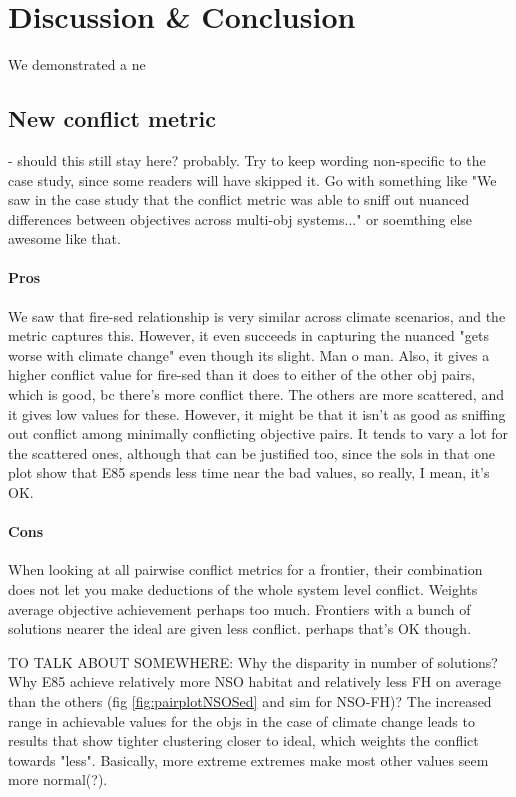 \section{Discussion \& Conclusion}
We demonstrated a ne

\subsection{New conflict metric} - should this still stay here? probably. Try to keep wording non-specific to the case study, since some readers will have skipped it. Go with something like "We saw in the case study that the conflict metric was able to sniff out nuanced differences between objectives across multi-obj systems..." or soemthing else awesome like that.

\paragraph{Pros}
We saw that fire-sed relationship is very similar across climate scenarios, and the metric captures this. However, it even succeeds in capturing the nuanced "gets worse with climate change" even though its slight. Man o man.
Also, it gives a higher conflict value for fire-sed than it does to either of the other obj pairs, which is good, bc there's more conflict there. The others are more scattered, and it gives low values for these.
However, it might be that it isn't as good as sniffing out conflict among minimally conflicting objective pairs. It tends to vary a lot for the scattered ones, although that can be justified too, since the sols in that one plot show that E85 spends less time near the bad values, so really, I mean, it's OK.

\paragraph{Cons}
When looking at all pairwise conflict metrics for a frontier, their combination does not let you make deductions of the whole system level conflict.
Weights average objective achievement perhaps too much. Frontiers with a bunch of solutions nearer the ideal are given less conflict. perhaps that's OK though.


TO TALK ABOUT SOMEWHERE:
Why the disparity in number of solutions?
Why E85 achieve relatively more NSO habitat and relatively less FH on average than the others (fig \ref{fig:pairplotNSOSed} and sim for NSO-FH)?
The increased range in achievable values for the objs in the case of climate change leads to results that show tighter clustering closer to ideal, which weights the conflict towards "less". Basically, more extreme extremes make most other values seem more normal(?).

